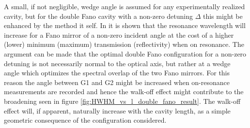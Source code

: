 A small, if not negligible, wedge angle is assumed for any experimentally realized cavity, but for the double Fano cavity with a non-zero detuning $\Delta$ this might be enhanced by the method it self. In \cite{Parthenopoulos} it is shown that the resonance wavelength will increase for a Fano mirror of a non-zero incident angle at the cost of a higher (lower) minimum (maximum) transmission (reflectivity) when on resonance. The argument can be made that the optimal double Fano configuration for a non-zero detuning is not necessarily normal to the optical axis, but rather at a wedge angle which optimizes the spectral overlap of the two Fano mirrors. For this reason the angle between G1 and G2 might be increased when on-resonance measurements are recorded and hence the walk-off effect might contribute to the broadening seen in figure \ref{fig:HWHM_vs_l_double_fano_result}. The walk-off effect will, if apparent, naturally increase with the cavity length, as a simple geometric consequence of the configuration considered. 
